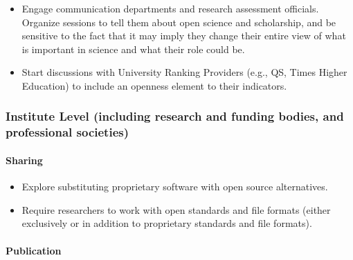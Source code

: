\begin{itemize}
\item
  Engage communication departments and research assessment officials.
  Organize sessions to tell them about open science and scholarship, and
  be sensitive to the fact that it may imply they change their entire
  view of what is important in science and what their role could be.
\item
  Start discussions with University Ranking Providers (e.g., QS, Times
  Higher Education) to include an openness element to their indicators.
\end{itemize}

\subsubsection{Institute Level (including research and funding bodies,
and professional
societies)}\label{institute-level-including-research-and-funding-bodies-and-professional-societies}

\paragraph{Sharing}\label{sharing}

\begin{itemize}
\item
  Explore substituting proprietary software with open source
  alternatives.
\item
  Require researchers to work with open standards and file formats
  (either exclusively or in addition to proprietary standards and file
  formats).
\end{itemize}

\paragraph{Publication}\label{publication-2}

